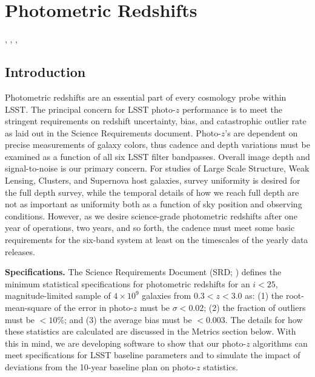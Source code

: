 %
%
%
%
%
%
\clearpage
\section{Photometric Redshifts}
\def\secname{photoz}\label{sec:\secname}

,
,
,

\subsection{Introduction}

Photometric redshifts are an essential part of
every cosmology probe within LSST.  The principal concern for LSST
photo-$z$ performance is to meet the stringent requirements on redshift
uncertainty, bias, and catastrophic outlier rate as laid out in the
Science Requirements document. Photo-$z$'s are dependent on precise
measurements of galaxy colors, thus cadence and depth variations must be
examined as a function of all six LSST filter bandpasses.  Overall image
depth and signal-to-noise is our primary concern. For studies of Large
Scale Structure, Weak Lensing, Clusters, and Supernova host galaxies,
survey uniformity is desired for the full depth survey, while the
temporal details of how we reach full depth are not as important as
uniformity both as a function of sky position and observing conditions.
However, as we desire science-grade photometric redshifts after one year
of operations, two years, and so forth, the cadence must meet some basic
requirements for the six-band system at least on the timescales of the
yearly data releases.

\textbf{Specifications.} The Science Requirements Document (SRD; \citealt{LPM-17}) defines
the minimum statistical specifications for photometric redshifts for an
$i<25$, magnitude-limited sample of $4\times10^9$ galaxies from
$0.3<z<3.0$ as: (1) the root-mean-square of the error in photo-$z$
must be $\sigma < 0.02$; (2) the fraction of outliers must be $<10\%$;
and (3) the average bias must be $<0.003$.
The details for how these statistics are calculated are discussed in the Metrics section below.
With this in mind, we are developing software to show that our photo-$z$ algorithms
can meet specifications for LSST baseline parameters and to simulate the
impact of deviations from the 10-year baseline plan on photo-$z$
statistics.

